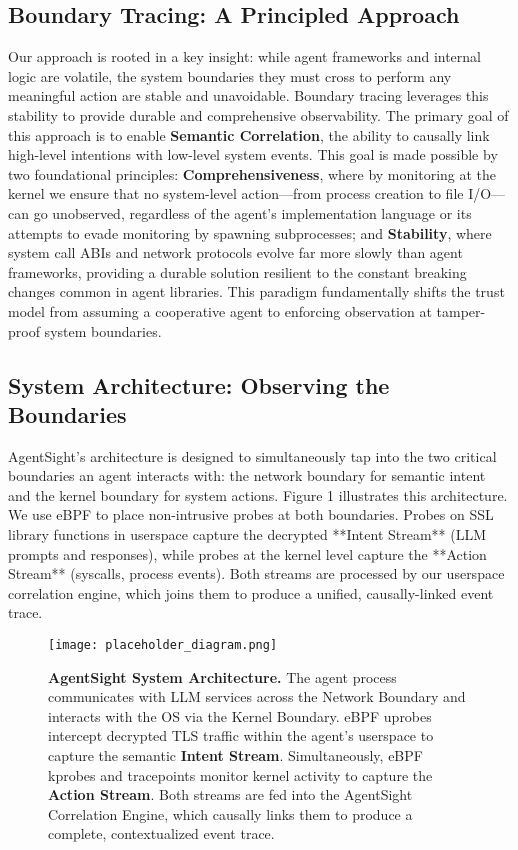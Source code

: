 \subsection{Boundary Tracing: A Principled Approach}
Our approach is rooted in a key insight: while agent frameworks and internal logic are volatile, the system boundaries they must cross to perform any meaningful action are stable and unavoidable. Boundary tracing leverages this stability to provide durable and comprehensive observability. The primary goal of this approach is to enable \textbf{Semantic Correlation}, the ability to causally link high-level intentions with low-level system events. This goal is made possible by two foundational principles: \textbf{Comprehensiveness}, where by monitoring at the kernel we ensure that no system-level action—from process creation to file I/O—can go unobserved, regardless of the agent's implementation language or its attempts to evade monitoring by spawning subprocesses; and \textbf{Stability}, where system call ABIs and network protocols evolve far more slowly than agent frameworks, providing a durable solution resilient to the constant breaking changes common in agent libraries. This paradigm fundamentally shifts the trust model from assuming a cooperative agent to enforcing observation at tamper-proof system boundaries.

\subsection{System Architecture: Observing the Boundaries}
AgentSight's architecture is designed to simultaneously tap into the two critical boundaries an agent interacts with: the network boundary for semantic intent and the kernel boundary for system actions. Figure 1 illustrates this architecture. We use eBPF to place non-intrusive probes at both boundaries. Probes on SSL library functions in userspace capture the decrypted **Intent Stream** (LLM prompts and responses), while probes at the kernel level capture the **Action Stream** (syscalls, process events). Both streams are processed by our userspace correlation engine, which joins them to produce a unified, causally-linked event trace.

\begin{figure}[h!]
    \centering
    \texttt{[image: placeholder\_diagram.png]} %
    \caption{\textbf{AgentSight System Architecture.} The agent process communicates with LLM services across the Network Boundary and interacts with the OS via the Kernel Boundary. eBPF uprobes intercept decrypted TLS traffic within the agent's userspace to capture the semantic \textbf{Intent Stream}. Simultaneously, eBPF kprobes and tracepoints monitor kernel activity to capture the \textbf{Action Stream}. Both streams are fed into the AgentSight Correlation Engine, which causally links them to produce a complete, contextualized event trace.}
    \label{fig:architecture}
\end{figure}

